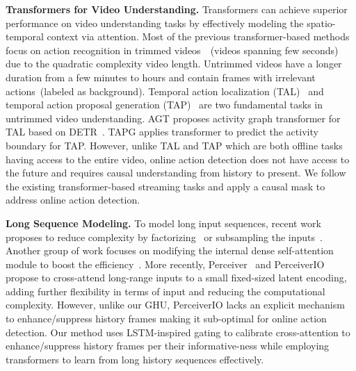\documentclass[10pt,twocolumn,letterpaper]{article}
\begin{document}
{\noindent \bf Transformers for Video Understanding.} Transformers can achieve superior performance on video understanding tasks by effectively modeling the spatio-temporal context via attention. Most of the previous transformer-based methods~\cite{bertasius2021space,arnab2021vivit,fan2021multiscale, neimark2021video} focus on action recognition in trimmed videos~\cite{carreira2017quo}~(videos spanning few seconds) due to the quadratic complexity \wrt video length. Untrimmed videos have a longer duration from a few minutes to hours and contain frames with irrelevant actions~(labeled as background). Temporal action localization (TAL)~\cite{shou2016temporal,xu2017r,gao2017turn,shou2017cdc,Zhao_2017_ICCV,buch2017sst,liu2019multi,lin2019bmn,zhu2021enriching,zhang2021temporal} and temporal action proposal generation (TAP)~\cite{lin2018bsn,lin2019bmn,tan2021relaxed} are two fundamental tasks in untrimmed video understanding. AGT\cite{nawhal2021activity} proposes activity graph transformer for TAL based on DETR~\cite{carion2020end}. TAPG\cite{wang2021temporal} applies transformer to predict the activity boundary for TAP. However, unlike TAL and TAP which are both offline tasks having access to the entire video, online action detection does not have access to the future and requires causal understanding from history to present. We follow the existing transformer-based streaming tasks\cite{girdhar2021anticipative, chen2021developing, xu2021long} and apply a causal mask to address online action detection.




{\noindent \bf Long Sequence Modeling.} To model long input sequences, recent work~\cite{dosovitskiy2020image} proposes to reduce complexity by factorizing~\cite{touvron2021training} or subsampling the inputs~\cite{chen2020generative}. Another group of work focuses on modifying the internal dense self-attention module to boost the efficiency~\cite{beltagy2020longformer,wang2020linformer}. More recently, Perceiver~\cite{jaegle2021perceiver} and PerceiverIO~\cite{jaegle2021perceiverio} propose to cross-attend long-range inputs to a small fixed-sized latent encoding, adding further flexibility in terms of input and reducing the computational complexity. However, unlike our GHU, PerceiverIO lacks an explicit mechanism to enhance/suppress history frames making it sub-optimal for online action detection. Our method uses LSTM-inspired gating to calibrate cross-attention to enhance/suppress history frames per their informative-ness while employing transformers to learn from long history sequences effectively.
\end{document}
